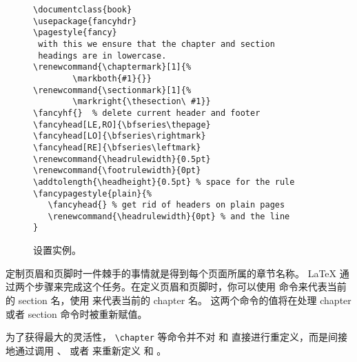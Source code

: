 \begin{figure}[!htbp]
\begin{lined}{\textwidth}
\begin{verbatim}
\documentclass{book}
\usepackage{fancyhdr}
\pagestyle{fancy}
 with this we ensure that the chapter and section
 headings are in lowercase.
\renewcommand{\chaptermark}[1]{%
        \markboth{#1}{}}
\renewcommand{\sectionmark}[1]{%
        \markright{\thesection\ #1}}
\fancyhf{}  % delete current header and footer
\fancyhead[LE,RO]{\bfseries\thepage}
\fancyhead[LO]{\bfseries\rightmark}
\fancyhead[RE]{\bfseries\leftmark}
\renewcommand{\headrulewidth}{0.5pt}
\renewcommand{\footrulewidth}{0pt}
\addtolength{\headheight}{0.5pt} % space for the rule
\fancypagestyle{plain}{%
   \fancyhead{} % get rid of headers on plain pages
   \renewcommand{\headrulewidth}{0pt} % and the line
}
\end{verbatim}
\end{lined}
\caption{ 设置实例。} \label{fancyhdr}
\end{figure}


定制页眉和页脚时一件棘手的事情就是得到每个页面所属的章节名称。
\LaTeX{} 通过两个步骤来完成这个任务。在定义页眉和页脚时，你可以使用
  命令来代表当前的 section 名，使用  来代表当前的 chapter 名。
这两个命令的值将在处理 chapter 或者 section 命令时被重新赋值。


为了获得最大的灵活性， \verb|\chapter| 等命令并不对  和
  直接进行重定义，而是间接地通过调用 、
 或者  来重新定义  和
 。

